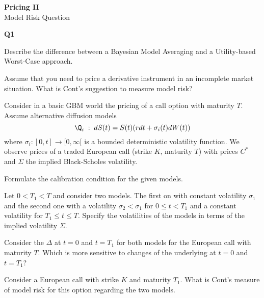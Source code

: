 \documentclass[11pt,a4paper,titlepage]{article}
\begin{document}
\setlength{\topmargin}{-2.5cm}

\begin{center} {\LARGE \bf Pricing II } \\[5mm]
                {\large Model Risk Question }
\end{center}

\vspace{0.3cm}

\pagestyle{empty}







\vspace{0.3cm}

\item[]{\bf Q1}





\item[(a)]
Describe the difference between a Bayesian Model Averaging and a Utility-based Worst-Case
approach.
\item[(b)] Assume that you need to price a derivative instrument in an incomplete market situation. What is Cont's suggestion to measure model risk?
\item[(c)]
Consider in a basic GBM world the pricing of a call option with maturity $T$.
Assume alternative diffusion models
\begin{equation}
\Q_i\;:\; dS(t) = S(t)(r dt + \sigma_i(t) dW(t))
\end{equation}
where $ \sigma_i: [0,t] \rightarrow [0, \infty[ $ is a bounded deterministic volatility function.
We observe prices of a traded European call (strike $K$, maturity $T$) with prices $C^*$ and
$\Sigma$ the implied Black-Scholes volatility.




\item[(i)]
Formulate the calibration condition for the given models.
\item[(ii)]
Let $0< T_1 <T$ and consider two models. The first on with constant volatility $\sigma_1$ and the second one with a volatility $\sigma_2 < \sigma _1$ for $0 \leq t <T_1$ and a constant volatility for $T_1\leq t \leq T$. Specify  the  volatilities of the models in terms of the implied volatility $\Sigma $.
\item[(iii)]
Consider the $\Delta$ at $t=0$ and $t=T_1$ for both models for the European call with maturity $T$. Which is more sensitive to changes of the underlying at $t=0$ and $t=T_1$?
\item[(iv)]
Consider  a  European call with strike $K$ and maturity $T_1$. What is Cont's measure of model risk for this option regarding the two models.
\end{document}
